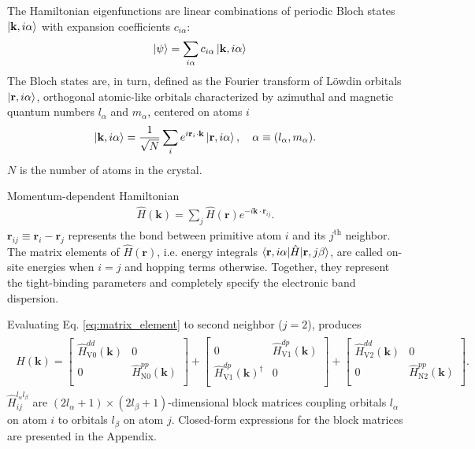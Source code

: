 \documentclass[twocolumn,showpacs,preprintnumbers,superscriptaddress,prb,floatfix,aps,10pt]{revtex4-1}
\renewcommand{\vec}[1]{\ensuremath{\mathbf{#1}}}
\newcommand*{\ham}{\hat{H}}
\newcommand*{\bloch}{\ket{\vec{k}, i\alpha}}
\newcommand*{\lowdin}{\ket{\vec{r}, i\alpha}}
\newcommand*{\bondvec}{\vec{r}_{ij}}
\begin{document}
The Hamiltonian eigenfunctions are linear combinations of periodic Bloch states $\bloch$ with expansion coefficients $c_{i\alpha}$:
\begin{align}
\label{eq:statevec}
\ket{\psi}  &= \sum_{i\alpha} c_{i\alpha} \bloch
\end{align}
%
The Bloch states are, in turn, defined as the Fourier transform of L\"owdin orbitals $\lowdin$, orthogonal atomic-like orbitals characterized by azimuthal and magnetic quantum numbers $l_\alpha$ and $m_\alpha$, centered on atoms $i$
\begin{equation}
\label{eq:bloch}
\bloch = \frac{1}{\sqrt{N}} \sum_i e^{i\vec{r}_i\cdot\vec{k}} \lowdin, 
\quad
\alpha \equiv (l_\alpha,m_\alpha).
\end{equation}
%
$N$ is the number of atoms in the crystal. 

Momentum-dependent Hamiltonian
\begin{align}
\label{eq:matrix_element}
\ham(\vec{k}) = \sum_j \ham(\vec{r}) e^{-i \vec{k}\cdot\vec{r}_{ij}} .
\end{align}
%
$\bondvec \equiv \vec{r}_i - \vec{r}_j$ represents the bond between primitive atom $i$ and its $j^{\textrm{th}}$ neighbor. The matrix elements of $\ham(\vec{r})$, i.e. energy integrals $\braket{\vec{r},i\alpha | \ham | \vec{r},j\beta}$, are called on-site energies when $i=j$ and hopping terms otherwise. Together, they represent the tight-binding parameters and completely specify the electronic band dispersion. 

Evaluating Eq. \ref{eq:matrix_element} to second neighbor ($j = 2$), produces
%
%
\begin{align}
\label{eq:ham_explicit}
\begin{split}
\ham(\vec{k}) =
\begin{bmatrix}
\ham_{\textrm{V}0}^{dd}(\vec{k}) & 0 \\
0 & \ham_{\textrm{N}0}^{pp}(\vec{k})\\
\end{bmatrix}
+ 
\begin{bmatrix}
0 &\ham_{\textrm{V}1}^{dp}(\vec{k}) \\
\ham_{\textrm{V}1}^{dp}(\vec{k})^{\dagger} & 0 \\
\end{bmatrix}
+ 
\begin{bmatrix}
\ham_{\textrm{V}2}^{dd}(\vec{k}) & 0 \\
0 & \ham_{\textrm{N}2}^{pp}(\vec{k}) \\
\end{bmatrix} .
\end{split}
\end{align}
%
%
$\ham_{ij}^{l_\alpha l_\beta}$ are $(2l_\alpha+1)\times(2l_\beta+1)$-dimensional block matrices coupling orbitals $l_\alpha$ on atom $i$ to orbitals $l_\beta$ on atom $j$. Closed-form expressions for the block matrices are presented in the Appendix.
\end{document}
